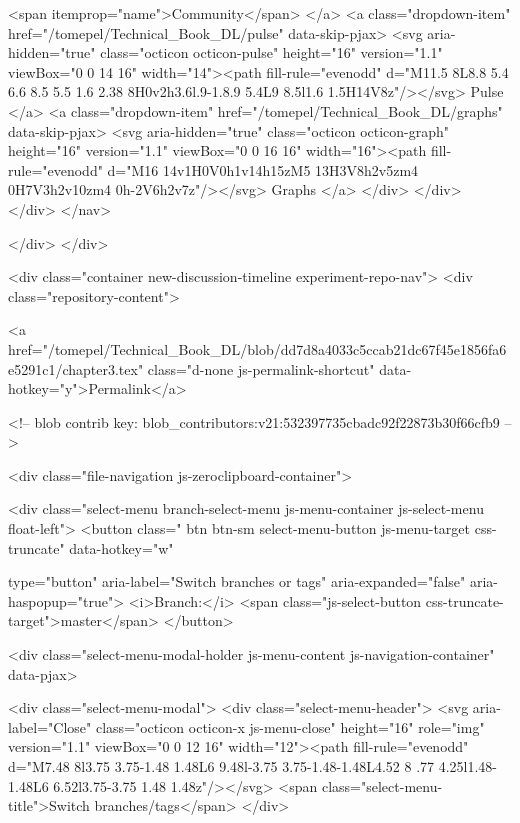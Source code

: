               <span itemprop="name">Community</span>
            </a>
          <a class="dropdown-item" href="/tomepel/Technical_Book_DL/pulse" data-skip-pjax>
            <svg aria-hidden="true" class="octicon octicon-pulse" height="16" version="1.1" viewBox="0 0 14 16" width="14"><path fill-rule="evenodd" d="M11.5 8L8.8 5.4 6.6 8.5 5.5 1.6 2.38 8H0v2h3.6l.9-1.8.9 5.4L9 8.5l1.6 1.5H14V8z"/></svg>
            Pulse
          </a>
          <a class="dropdown-item" href="/tomepel/Technical_Book_DL/graphs" data-skip-pjax>
            <svg aria-hidden="true" class="octicon octicon-graph" height="16" version="1.1" viewBox="0 0 16 16" width="16"><path fill-rule="evenodd" d="M16 14v1H0V0h1v14h15zM5 13H3V8h2v5zm4 0H7V3h2v10zm4 0h-2V6h2v7z"/></svg>
            Graphs
          </a>
        </div>
      </div>
    </div>
</nav>

      </div>
    </div>

<div class="container new-discussion-timeline experiment-repo-nav">
  <div class="repository-content">

    
  <a href="/tomepel/Technical_Book_DL/blob/dd7d8a4033c5ccab21dc67f45e1856fa6e5291c1/chapter3.tex" class="d-none js-permalink-shortcut" data-hotkey="y">Permalink</a>

  <!-- blob contrib key: blob_contributors:v21:532397735cbadc92f22873b30f66cfb9 -->

  <div class="file-navigation js-zeroclipboard-container">
    
<div class="select-menu branch-select-menu js-menu-container js-select-menu float-left">
  <button class=" btn btn-sm select-menu-button js-menu-target css-truncate" data-hotkey="w"
    
    type="button" aria-label="Switch branches or tags" aria-expanded="false" aria-haspopup="true">
      <i>Branch:</i>
      <span class="js-select-button css-truncate-target">master</span>
  </button>

  <div class="select-menu-modal-holder js-menu-content js-navigation-container" data-pjax>

    <div class="select-menu-modal">
      <div class="select-menu-header">
        <svg aria-label="Close" class="octicon octicon-x js-menu-close" height="16" role="img" version="1.1" viewBox="0 0 12 16" width="12"><path fill-rule="evenodd" d="M7.48 8l3.75 3.75-1.48 1.48L6 9.48l-3.75 3.75-1.48-1.48L4.52 8 .77 4.25l1.48-1.48L6 6.52l3.75-3.75 1.48 1.48z"/></svg>
        <span class="select-menu-title">Switch branches/tags</span>
      </div>

